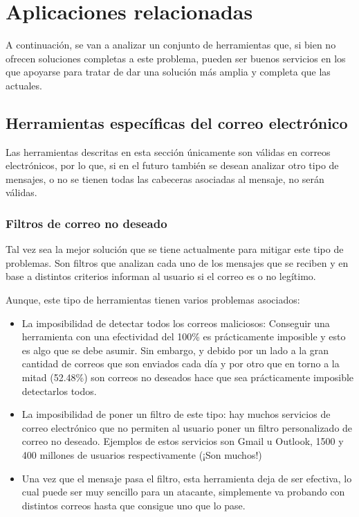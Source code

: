 \section{Aplicaciones relacionadas}
A continuación, se van a analizar un conjunto de herramientas que, si bien no ofrecen soluciones completas a este problema, pueden ser buenos servicios en los que apoyarse para tratar de dar una solución más amplia y completa que las actuales.
\subsection{Herramientas específicas del correo electrónico}
Las herramientas descritas en esta sección únicamente son válidas en correos electrónicos, por lo que, si en el futuro también se desean analizar otro tipo de mensajes, o no se tienen todas las cabeceras asociadas al mensaje, no serán válidas.

\subsubsection{Filtros de correo no deseado}
Tal vez sea la mejor solución que se tiene actualmente para mitigar este tipo de problemas. Son filtros que analizan cada uno de los mensajes que se reciben y en base a distintos criterios informan al usuario si el correo es o no legítimo.

Aunque, este tipo de herramientas tienen varios problemas asociados:

\begin{itemize}
    \item La imposibilidad de detectar todos los correos maliciosos: Conseguir una herramienta con una efectividad del 100\% es prácticamente imposible y esto es algo que se debe asumir. Sin embargo, y debido por un lado a la gran cantidad de correos que son enviados cada día \cite{cifrasCorreo} y por otro que en torno a la mitad (52.48\%) son correos no deseados \cite{cifrasPhising} hace que sea prácticamente imposible detectarlos todos. 
    \item La imposibilidad de poner un filtro de este tipo: hay muchos servicios de correo electrónico que no permiten al usuario poner un filtro personalizado de correo no deseado. Ejemplos de estos servicios son Gmail u Outlook,  1500 \cite{usuarios_gmail} y 400 \cite{usuarios_hotmail} millones de usuarios respectivamente (¡Son muchos!)
    \item Una vez que el mensaje pasa el filtro, esta herramienta deja de ser efectiva, lo cual puede ser muy sencillo para un atacante, simplemente va probando con distintos correos hasta que consigue uno que lo pase. 
\end{itemize}

